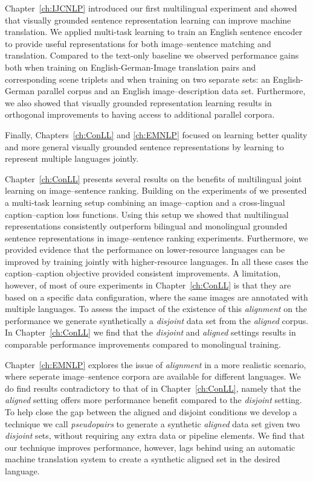 Chapter~\ref{ch:IJCNLP} introduced our first multilingual experiment and showed that visually grounded sentence
representation learning can improve machine translation. 
We applied multi-task learning to train an English sentence encoder to provide useful representations for both
image--sentence matching and translation. Compared to the text-only baseline 
we observed performance gains both when 
training on English-German-Image translation pairs and corresponding scene triplets and when training on two separate
sets: an English-German parallel corpus and an English image--description data set. 
Furthermore, we also showed that visually grounded representation learning results in orthogonal 
improvements to having access to additional parallel corpora.

Finally,  Chapters~\ref{ch:ConLL} and \ref{ch:EMNLP} focused on learning better quality and more general 
visually grounded sentence representations by learning to represent multiple languages jointly. 

Chapter~\ref{ch:ConLL} presents several results on the benefits of multilingual joint learning on image--sentence
ranking. Building on the experiments of \cite{gella2017image} we presented a multi-task learning setup
combining an image--caption and a cross-lingual caption--caption  loss functions. Using this setup we showed that
multilingual representations consistently outperform bilingual and monolingual grounded sentence representations
in image--sentence ranking experiments. Furthermore, we provided evidence that the performance on lower-resource 
languages can be improved by training jointly with higher-resource languages. In all these cases the caption--caption
objective provided consistent improvements.												
A limitation, however, of most of oure experiments in Chapter~\ref{ch:ConLL} is that they are based on a 
specific data configuration, where the same images are annotated with multiple languages. To assess
the impact of the existence of  this \emph{alignment} on the performance we generate synthetically a \emph{disjoint}
data set from the \emph{aligned} corpus. In Chapter~\ref{ch:ConLL} we find that the \emph{disjoint} and \emph{aligned}
settings results in comparable performance improvements compared to monolingual training.

Chapter~\ref{ch:EMNLP} explores the issue of \emph{alignment} in a more realistic scenario, where
seperate image--sentence corpora are available for different languages. 
We do find results contradictory to that of in Chapter~\ref{ch:ConLL}, namely that the \emph{aligned}
setting offers more performance benefit compared to the \emph{disjoint} setting. 
To help close the gap between the aligned and disjoint conditions we develop a technique we call \emph{pseudopairs} 
to generate a synthetic \emph{aligned} data set given two \emph{disjoint} sets, without requiring any extra
data or pipeline elements. We find that our technique improves performance, however, lags behind using
an automatic machine translation system to create a synthetic aligned set in the desired language.

